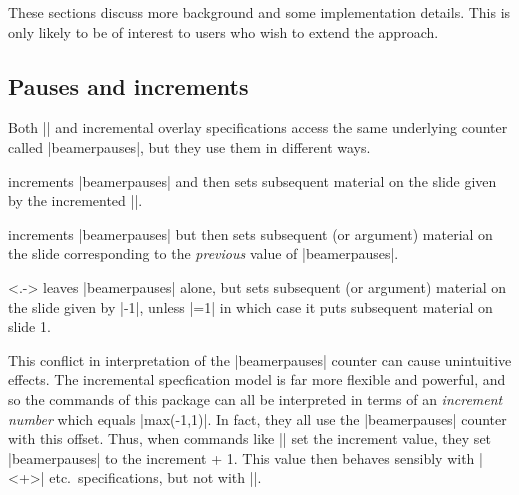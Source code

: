 \documentclass[a4paper]{ltxdoc}
\begin{document}
These sections discuss more background and some implementation details.   This
is only likely to be of interest to users who wish to extend the approach.

\subsection{Pauses and increments}

Both |\pause| and incremental overlay specifications access the same underlying
counter called |beamerpauses|, but they use them in different ways.

\begin{command}{\pause}
  increments |beamerpauses| and then sets subsequent material on the slide
  given by the incremented |\value{beamerpauses}|. 
\end{command}

\begin{command}{\onslide<+->}
  increments |beamerpauses| but then sets subsequent (or argument) material on
  the slide corresponding to the \emph{previous} value of |beamerpauses|.
\end{command}

\begin{command}{\onslide<.->}
  leaves |beamerpauses| alone, but sets subsequent (or argument) material on the
  slide given by |\value{beamerpauses}-1|, unless |\value{beamerpauses}=1| in
  which case it puts subsequent material on slide 1.
\end{command}

This conflict in interpretation of the |beamerpauses| counter can cause
unintuitive effects.  The incremental specfication model is far more flexible
and powerful, and so the commands of this package can all be interpreted in
terms of an \emph{increment number} which equals
|max(\value{beamerpauses}-1,1)|.  In fact, they all use the |beamerpauses|
counter with this offset.  Thus, when commands like |\resetincr| set the
increment value, they set |beamerpauses| to the increment + 1.  This value then
behaves sensibly with |<+>| etc.\ specifications, but not with |\pause|.  





%




%  
% 
\end{document}
